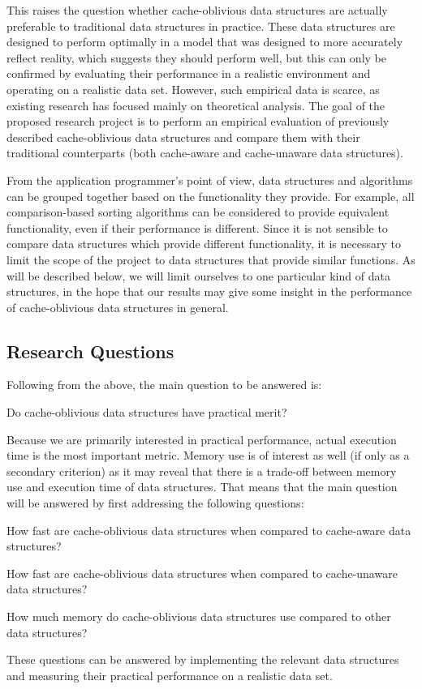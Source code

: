 \documentclass{acm_proc_article-sp}
\begin{document}
This raises the question whether cache-oblivious data structures are actually preferable to traditional data structures in practice. These data structures are designed to perform optimally in a model that was designed to more accurately reflect reality, which suggests they should perform well, but this can only be confirmed by evaluating their performance in a realistic environment and operating on a realistic data set. However, such empirical data is scarce, as existing research has focused mainly on theoretical analysis. The goal of the proposed research project is to perform an empirical evaluation of previously described cache-oblivious data structures and compare them with their traditional counterparts (both cache-aware and cache-unaware data structures).

From the application programmer's point of view, data structures and algorithms can be grouped together based on the functionality they provide. For example, all comparison-based sorting algorithms can be considered to provide equivalent functionality, even if their performance is different. Since it is not sensible to compare data structures which provide different functionality, it is necessary to limit the scope of the project to data structures that provide similar functions. As will be described below, we will limit ourselves to one particular kind of data structures, in the hope that our results may give some insight in the performance of cache-oblivious data structures in general.

\subsection{Research Questions}
Following from the above, the main question to be answered is:
\begin{list}{}{}
\item Do cache-oblivious data structures have practical merit?
\end{list}

Because we are primarily interested in practical performance, actual execution time is the most important metric. Memory use is of interest as well (if only as a secondary criterion) as it may reveal that there is a trade-off between memory use and execution time of data structures. That means that the main question will be answered by first addressing the following questions:
\begin{list}{.}{}
\item How fast are cache-oblivious data structures when compared to cache-aware data structures?
\item How fast are cache-oblivious data structures when compared to cache-unaware data structures?
\item How much memory do cache-oblivious data structures use compared to other data structures?
\end{list}
These questions can be answered by implementing the relevant data structures and measuring their practical performance on a realistic data set.
\end{document}
